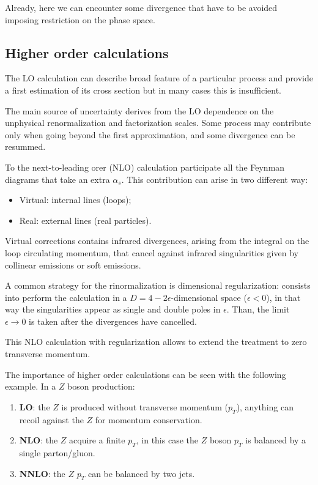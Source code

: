 Already, here we can encounter some divergence that have to be avoided imposing restriction on the phase space.

\subsection{Higher order calculations}

The LO calculation can describe broad feature of a particular process and provide a first estimation of its cross section but in many cases this is insufficient.

The main source of uncertainty derives from the LO dependence  on the unphysical renormalization and factorization scales. Some process may contribute only when going beyond the first approximation, and some divergence can be resummed. 

To the next-to-leading orer (NLO) calculation participate all the Feynman diagrams that take an extra $\alpha_s$. This contribution can arise in two different way:
\begin{itemize}
	\item Virtual: internal lines (loops);
	\item Real: external lines (real particles).
\end{itemize}

Virtual corrections contains infrared divergences, arising from the integral on the loop circulating momentum, that cancel against infrared singularities given by collinear emissions or soft emissions. 

A common strategy for the rinormalization is dimensional regularization: consists into perform the calculation in a $D=4-2\epsilon$-dimensional space ($\epsilon<0$), in that way the singularities appear as single and double poles in $\epsilon$. Than, the limit $\epsilon\rightarrow0$ is taken after the divergences have cancelled.

This NLO calculation with regularization allows to extend the treatment to zero transverse momentum.

The importance of higher order calculations can be seen with the following example. In a $Z$ boson production:
\begin{enumerate}[label=$\arabic*)$]
	\item \textbf{LO}: the $Z$ is produced without transverse momentum ($p_T$), anything can recoil against the $Z$ for momentum conservation.
	\item \textbf{NLO}: the $Z$ acquire a finite $p_T$, in this case the $Z$ boson $p_T$ is balanced by a single \mbox{parton/gluon}.
	\item  \textbf{NNLO}: the $Z$ $p_T$ can be balanced by two jets. 
\end{enumerate}



